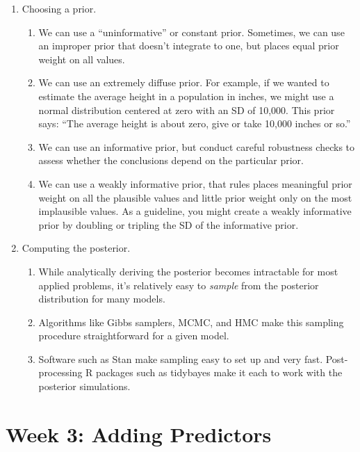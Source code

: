 \documentclass[
]{book}
\providecommand{\tightlist}{%
  \setlength{\itemsep}{0pt}\setlength{\parskip}{0pt}}
\begin{document}
\begin{enumerate}
\def\labelenumi{\arabic{enumi}.}
\tightlist
\item
  Choosing a prior.

  \begin{enumerate}
  \def\labelenumii{\alph{enumii}.}
  \tightlist
  \item
    We can use a ``uninformative'' or constant prior. Sometimes, we can use an improper prior that doesn't integrate to one, but places equal prior weight on all values.
  \item
    We can use an extremely diffuse prior. For example, if we wanted to estimate the average height in a population in inches, we might use a normal distribution centered at zero with an SD of 10,000. This prior says: ``The average height is about zero, give or take 10,000 inches or so.''
  \item
    We can use an informative prior, but conduct careful robustness checks to assess whether the conclusions depend on the particular prior.
  \item
    We can use a weakly informative prior, that rules places meaningful prior weight on all the plausible values and little prior weight only on the most implausible values. As a guideline, you might create a weakly informative prior by doubling or tripling the SD of the informative prior.
  \end{enumerate}
\item
  Computing the posterior.

  \begin{enumerate}
  \def\labelenumii{\alph{enumii}.}
  \tightlist
  \item
    While analytically deriving the posterior becomes intractable for most applied problems, it's relatively easy to \emph{sample} from the posterior distribution for many models.
  \item
    Algorithms like Gibbs samplers, MCMC, and HMC make this sampling procedure straightforward for a given model.
  \item
    Software such as Stan make sampling easy to set up and very fast. Post-processing R packages such as tidybayes make it each to work with the posterior simulations.
  \end{enumerate}
\end{enumerate}

\hypertarget{week-3-adding-predictors}{%
\chapter{Week 3: Adding Predictors}\label{week-3-adding-predictors}}
\end{document}
